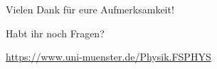 \documentclass[german, ngerman]{beamer}
\begin{document}
\begin{frame}
	\begin{block}{}
		\centering
		Vielen Dank für eure Aufmerksamkeit!
	\end{block}

	\begin{block}{}
		\centering
		Habt ihr noch Fragen?
	\end{block}

	\begin{center}

		\medskip
		\url{https://www.uni-muenster.de/Physik.FSPHYS}
	\end{center}
\end{frame}
\end{document}
